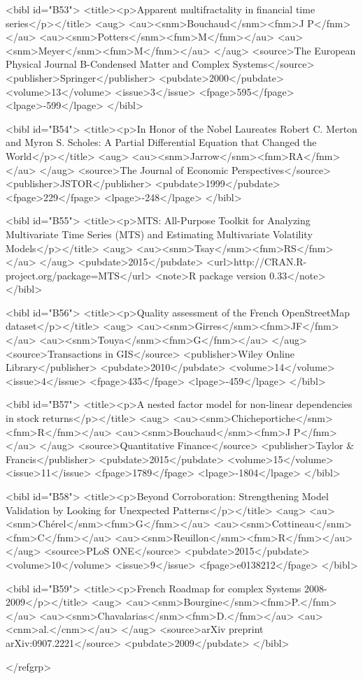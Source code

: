 \documentclass{bmcart}
\begin{document}
\begin{backmatter}
{<bibl id="B53">
  <title><p>Apparent multifractality in financial time series</p></title>
  <aug>
    <au><snm>Bouchaud</snm><fnm>J P</fnm></au>
    <au><snm>Potters</snm><fnm>M</fnm></au>
    <au><snm>Meyer</snm><fnm>M</fnm></au>
  </aug>
  <source>The European Physical Journal B-Condensed Matter and Complex
  Systems</source>
  <publisher>Springer</publisher>
  <pubdate>2000</pubdate>
  <volume>13</volume>
  <issue>3</issue>
  <fpage>595</fpage>
  <lpage>-599</lpage>
</bibl>

<bibl id="B54">
  <title><p>In Honor of the Nobel Laureates Robert C. Merton and Myron S.
  Scholes: A Partial Differential Equation that Changed the World</p></title>
  <aug>
    <au><snm>Jarrow</snm><fnm>RA</fnm></au>
  </aug>
  <source>The Journal of Economic Perspectives</source>
  <publisher>JSTOR</publisher>
  <pubdate>1999</pubdate>
  <fpage>229</fpage>
  <lpage>-248</lpage>
</bibl>

<bibl id="B55">
  <title><p>MTS: All-Purpose Toolkit for Analyzing Multivariate Time Series
  (MTS) and Estimating Multivariate Volatility Models</p></title>
  <aug>
    <au><snm>Tsay</snm><fnm>RS</fnm></au>
  </aug>
  <pubdate>2015</pubdate>
  <url>http://CRAN.R-project.org/package=MTS</url>
  <note>R package version 0.33</note>
</bibl>

<bibl id="B56">
  <title><p>Quality assessment of the French OpenStreetMap dataset</p></title>
  <aug>
    <au><snm>Girres</snm><fnm>JF</fnm></au>
    <au><snm>Touya</snm><fnm>G</fnm></au>
  </aug>
  <source>Transactions in GIS</source>
  <publisher>Wiley Online Library</publisher>
  <pubdate>2010</pubdate>
  <volume>14</volume>
  <issue>4</issue>
  <fpage>435</fpage>
  <lpage>-459</lpage>
</bibl>

<bibl id="B57">
  <title><p>A nested factor model for non-linear dependencies in stock
  returns</p></title>
  <aug>
    <au><snm>Chicheportiche</snm><fnm>R</fnm></au>
    <au><snm>Bouchaud</snm><fnm>J P</fnm></au>
  </aug>
  <source>Quantitative Finance</source>
  <publisher>Taylor \& Francis</publisher>
  <pubdate>2015</pubdate>
  <volume>15</volume>
  <issue>11</issue>
  <fpage>1789</fpage>
  <lpage>-1804</lpage>
</bibl>

<bibl id="B58">
  <title><p>Beyond Corroboration: Strengthening Model Validation by Looking for
  Unexpected Patterns</p></title>
  <aug>
    <au><snm>Ch{\'e}rel</snm><fnm>G</fnm></au>
    <au><snm>Cottineau</snm><fnm>C</fnm></au>
    <au><snm>Reuillon</snm><fnm>R</fnm></au>
  </aug>
  <source>PLoS ONE</source>
  <pubdate>2015</pubdate>
  <volume>10</volume>
  <issue>9</issue>
  <fpage>e0138212</fpage>
</bibl>

<bibl id="B59">
  <title><p>{French Roadmap for complex Systems 2008-2009}</p></title>
  <aug>
    <au><snm>{Bourgine}</snm><fnm>P.</fnm></au>
    <au><snm>{Chavalarias}</snm><fnm>D.</fnm></au>
    <au><cnm>al.</cnm></au>
  </aug>
  <source>arXiv preprint arXiv:0907.2221</source>
  <pubdate>2009</pubdate>
</bibl>

</refgrp>
} %



\end{backmatter}
\end{document}
